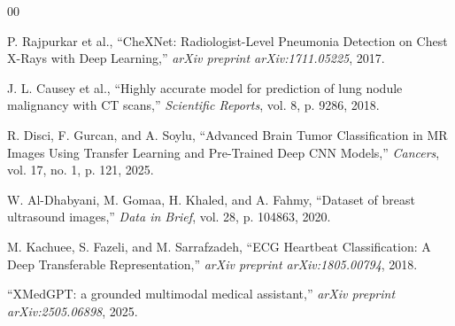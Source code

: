 \documentclass[conference]{IEEEtran}
\begin{document}
\begin{thebibliography}{00}

 P. Rajpurkar et al., ``CheXNet: Radiologist-Level Pneumonia Detection on Chest X-Rays with Deep Learning,'' \textit{arXiv preprint arXiv:1711.05225}, 2017.

 J. L. Causey et al., ``Highly accurate model for prediction of lung nodule malignancy with CT scans,'' \textit{Scientific Reports}, vol. 8, p. 9286, 2018.

 R. Disci, F. Gurcan, and A. Soylu, ``Advanced Brain Tumor Classification in MR Images Using Transfer Learning and Pre-Trained Deep CNN Models,'' \textit{Cancers}, vol. 17, no. 1, p. 121, 2025.

 W. Al-Dhabyani, M. Gomaa, H. Khaled, and A. Fahmy, ``Dataset of breast ultrasound images,'' \textit{Data in Brief}, vol. 28, p. 104863, 2020.

 M. Kachuee, S. Fazeli, and M. Sarrafzadeh, ``ECG Heartbeat Classification: A Deep Transferable Representation,'' \textit{arXiv preprint arXiv:1805.00794}, 2018.

 ``XMedGPT: a grounded multimodal medical assistant,'' \textit{arXiv preprint arXiv:2505.06898}, 2025.

\end{thebibliography}
\end{document}
